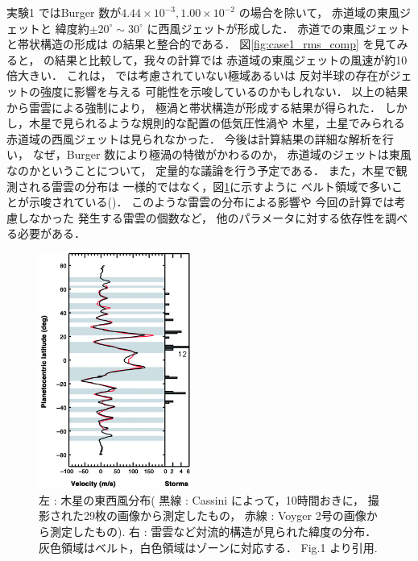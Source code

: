\documentclass[a4j,12pt,openbib,oneside]{jreport}
\begin{document}
実験1 ではBurger 数が$4.44 \times10^{-3}, 1.00 \times 10^{-2}$ の場合を除いて，
赤道域の東風ジェットと
緯度約$\pm 20^\circ \sim 30^\circ$ に西風ジェットが形成した．
赤道での東風ジェットと帯状構造の形成は
\cite{Showman2007} の結果と整合的である．
%
図\ref{fig:case1_rms_comp} を見てみると，
\cite{Showman2007} の結果と比較して，我々の計算では
赤道域の東風ジェットの風速が約10倍大きい．
これは，\cite{Showman2007} では考慮されていない極域あるいは
反対半球の存在がジェットの強度に影響を与える
可能性を示唆しているのかもしれない．
%
以上の結果から雷雲による強制により，
極渦と帯状構造が形成する結果が得られた．
しかし，木星で見られるような規則的な配置の低気圧性渦や
木星，土星でみられる赤道域の西風ジェットは見られなかった．
%
今後は計算結果の詳細な解析を行い，
なぜ，Burger 数により極渦の特徴がかわるのか，
赤道域のジェットは東風なのかということについて，
定量的な議論を行う予定である．
%
また，木星で観測される雷雲の分布は
一様的ではなく，図\ref{fig:thunderstorm}に示すように
ベルト領域で多いことが示唆されている(\cite{Porco2003})．
このような雷雲の分布による影響や
今回の計算では考慮しなかった
発生する雷雲の個数など，
他のパラメータに対する依存性を調べる必要がある．
\begin{figure}[ht]
  \begin{center}
    \includegraphics[clip,width=5cm]{./fig/conclusion/thunderstorm.jpg}
    \caption{
      \footnotesize{左 : 木星の東西風分布(
黒線 : Cassini によって，10時間おきに，
撮影された29枚の画像から測定したもの，
赤線 : Voyger 2号の画像から測定したもの\citep{Limaye1986}).
右 : 雷雲など対流的構造が見られた緯度の分布．
灰色領域はベルト，白色領域はゾーンに対応する．
\cite{Porco2003} Fig.1 より引用.
      }
    }
    \label{fig:thunderstorm}
  \end{center}
\end{figure}
%
\def\acknow{謝辞}
\end{document}
